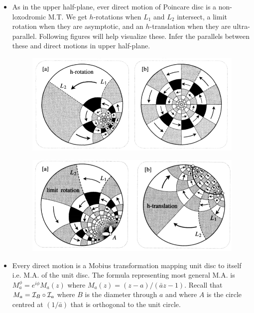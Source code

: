 \documentclass[12pt]{article}
\def\mc{\ensuremath\mathcal}
\begin{document}
\begin{itemize}
    \item As in the upper half-plane, ever direct motion of Poincare disc is a non-loxodromic M.T. We get $h$-rotations when $L_1$ and $L_2$ intersect, a limit rotation when they are asymptotic, and an $h$-translation when they are ultra-parallel. Following figures will help visualize these. Infer the parallels between these and direct motions in upper half-plane.

    \begin{figure}[h!]
        \centering
        \includegraphics[scale=0.7]{fig_32}
        \label{fig_32}
    \end{figure}

    \begin{figure}[h!]
        \centering
        \includegraphics[scale=0.7]{fig_33}
        \label{fig_33}
    \end{figure}

    \item Every direct motion is a Mobius transformation mapping unit disc to itself i.e. M.A. of the unit disc. The formula representing most general M.A. is $M_{a}^{\phi} = e^{i\phi}M_{a}(z)$ where $M_{a}(z) = (z-a)/(\bar{a}z-1)$. Recall that $M_a = \mc{I}_B \circ \mc{I}_a$ where $B$ is the diameter through $a$ and where $A$ is the circle centred at $(1/\bar{a})$ that is orthogonal to the unit circle.


\end{itemize}
\end{document}
